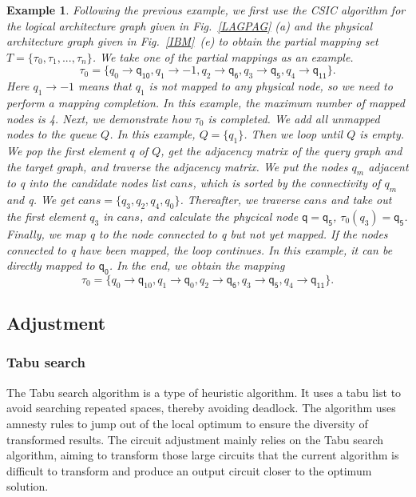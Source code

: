 \documentclass[journal]{IEEEtran}
\newtheorem{example}{Example}
\begin{document}
\begin{example}
	Following the previous example, we first use the CSIC algorithm for the logical architecture graph given in Fig.~\ref{LAGPAG} (a) and the physical architecture graph given in Fig.~\ref{IBM}~(e) to obtain the partial mapping set $T=\{\tau_{0},\tau_{1},...,\tau_{n}\}$. We take one of the partial mappings as an example.
	$$\tau_{0}=\{\textit{q}_\textit{0}\rightarrow \textsf{q}_{\textsf{10}},\textit{q}_\textit{1}\rightarrow -1,
	\textit{q}_\textit{2}\rightarrow \textsf{q}_{\textsf{6}},\textit{q}_\textit{3}\rightarrow \textsf{q}_{\textsf{5}},\textit{q}_\textit{4}\rightarrow \textsf{q}_{\textsf{11}}\}. $$ 
Here $\textit{q}_\textit{1}\rightarrow -1$ means that $\textit{q}_\textit{1}$ is not mapped to any physical node, so we need to perform a mapping completion. In this example, the maximum number of mapped nodes is 4. Next, we demonstrate how $\tau_{0}$ is completed. We add all unmapped nodes to the queue $Q$. In this example, $Q=\{\textit{q}_\textit{1}\}$. Then we loop until $Q$ is empty. We pop the first element $q$ of $Q$, get the adjacency matrix of the query graph and the target graph, and traverse the adjacency matrix. We put the nodes  $\textit{q}_\textit{m}$ adjacent to \textit{q} into the candidate nodes list $cans$, which is sorted by the connectivity of $\textit{q}_\textit{m}$ and \textit{q}. We get $cans=\{\textit{q}_\textit{3},\textit{q}_\textit{2},\textit{q}_\textit{4},\textit{q}_\textit{0}\}$. Thereafter, we traverse $cans$ and take out  the first element $\textit{q}_\textit{3}$ in $cans$, and calculate the phycical node $\textsf{q}=\textsf{q}_{\textsf{5}}$, $\tau_0(\textit{q}_\textit{3})=\textsf{q}_{\textsf{5}}$. Finally, we map \textit{q} to the node connected to \textsf{q} but not yet mapped. If the nodes connected to \textsf{q} have been mapped, the loop continues. In this example, it can be directly mapped to $\textsf{q}_{\textsf{0}}$. In the end, we obtain the mapping $$ \tau_{0}=\{\textit{q}_\textit{0}\rightarrow  \textsf{q}_{10},\textit{q}_\textit{1}\rightarrow \textsf{q}_{0},	\textit{q}_\textit{2}\rightarrow  \textsf{q}_{\textsf{6}},\textit{q}_\textit{3}\rightarrow  \textsf{q}_{\textsf{5}},\textit{q}_\textit{4}\rightarrow  \textsf{q}_{\textsf{11}}\}. $$
	\end{example}
\subsection{Adjustment}
\subsubsection{Tabu search}
The Tabu search algorithm is a type of heuristic algorithm. It uses a tabu list to avoid searching repeated spaces, thereby avoiding deadlock. The algorithm uses amnesty rules to jump out of the local optimum to ensure the diversity of transformed results. The circuit adjustment mainly relies on the Tabu search algorithm, aiming to transform those large circuits that the current algorithm is difficult to transform and produce an output circuit closer to the optimum solution.
\end{document}
